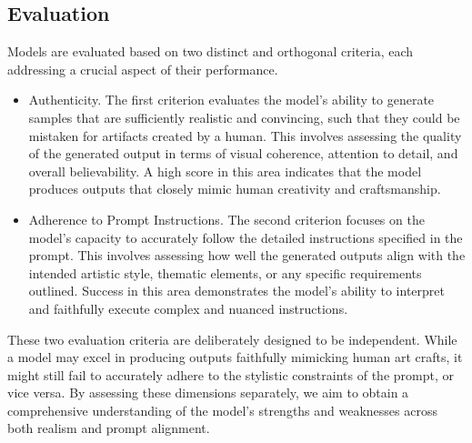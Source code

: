 \documentclass[sn-mathphys]{sn-jnl}
\begin{document}


\subsection{Evaluation}

Models are evaluated based on two distinct and orthogonal criteria, each addressing a crucial aspect of their performance.

\begin{itemize}
\item Authenticity. The first criterion evaluates the model's ability to generate samples that are sufficiently realistic and convincing, such that they could be mistaken for artifacts created by a human. This involves assessing the quality of the generated output in terms of visual coherence, attention to detail, and overall believability. A high score in this area indicates that the model produces outputs that closely mimic human creativity and craftsmanship.

\item Adherence to Prompt Instructions. The second criterion focuses on the model's capacity to accurately follow the detailed instructions specified in the prompt. This involves assessing how well the generated outputs align with the intended artistic style, thematic elements, or any specific requirements outlined. Success in this area demonstrates the model's ability to interpret and faithfully execute complex and nuanced instructions.
\end{itemize}

These two evaluation criteria are deliberately designed to be independent. While a model may excel in producing outputs faithfully mimicking human art crafts, it might still fail to accurately adhere to the stylistic constraints of the prompt, or vice versa. By assessing these dimensions separately, we aim to obtain a comprehensive understanding of the model's strengths and weaknesses across both realism and prompt alignment.
\end{document}
